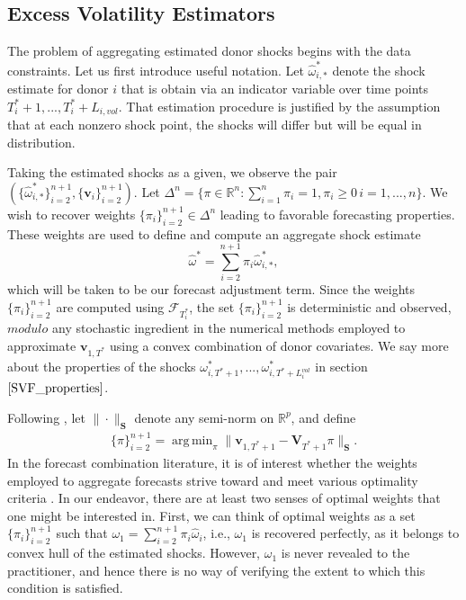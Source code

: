 \documentclass[11pt,3p,review,authoryear]{elsarticle}
\newcommand{\weight}{\pi}
\newcommand{\x}{\textbf{v}}
\newcommand{\V}{\textbf{V}}
\DeclareMathOperator*{\argmin}{arg\,min} %
\theoremstyle{definition}
\begin{document}
\subsection{Excess Volatility Estimators}
    \label{Excess Volatility Estimators}
   
    The problem of aggregating estimated donor shocks begins with the data constraints.  Let us first introduce useful notation.  Let $\hat\omega^{*}_{i,*}$ denote the shock estimate for donor $i$ that is obtain via an indicator variable over time points $T_{i}^{*}+1,...,T_{i}^{*}+L_{i,vol}$.  That estimation procedure is justified by the assumption that at each nonzero shock point, the shocks will differ but will be equal in distribution.  
    
    Taking the estimated shocks as a given, we observe the pair $(\{\hat\omega^{*}_{i,*}\}^{n+1}_{i=2},\{\textbf{v}_{i}\}^{n+1}_{i=2})$.  Let $\Delta^{n} = \{\pi \in \mathbb{R}^n: \sum_{i=1}^n \pi_i = 1, \pi_i \geq 0 \, i = 1,...,n\}$.  We wish to recover weights $\{\weight_{i}\}^{n+1}_{i=2} \in \Delta^{n}$ leading to favorable forecasting properties.  These weights are used to define and compute an aggregate shock estimate 
\begin{equation} \label{adjustment}
	  \hat\omega^{*} = \sum^{n+1}_{i=2}\weight_{i}\hat\omega^{*}_{i,*},
\end{equation}
    which will be taken to be our forecast adjustment term.  Since the weights $\{\weight_{i}\}_{i=2}^{n+1}$ are computed using $\mathcal{F}_{T^{*}_{i}}$, the set $\{\weight_{i}\}_{i=2}^{n+1}$ is deterministic and observed, $\textit{modulo}$ any stochastic ingredient in the numerical methods employed to approximate $\x_{1,T^{*}}$ using a convex combination of donor covariates.  We say more about the properties of the shocks $\omega^{*}_{i,T^{*}+1},...,\omega^{*}_{i,T^{*}+L^{vol}_{i}}$ in section $\ref{SVF_properties}$. 

    Following \citet{abadie2003economic,abadie2010synthetic,lin2021minimizing}, let $\|\cdot\|_{\textbf{S}}$ denote any semi-norm on $\mathbb{R}^{p}$, and define
    \begin{align*}
    \{\pi\}_{i=2}^{n+1} = \argmin_{\pi}\|\x_{1,T^* + 1} - \V_{T^* + 1}\pi\|_{\textbf{S}}. 
    \end{align*}
In the forecast combination literature, it is of interest whether the weights employed to aggregate forecasts strive toward and meet various optimality criteria \citep{timmermann2006forecast,wang2023forecast}.  In our endeavor, there are at least two senses of optimal weights that one might be interested in.  First, we can think of optimal weights as a set $\{\weight_{i}\}_{i=2}^{n+1}$ such that $\omega_{1} = \sum^{n+1}_{i=2}\weight_{i}\hat\omega_{i}$, i.e., $\omega_{1}$ is recovered perfectly, as it belongs to convex hull of the estimated shocks. However, $\omega_{1}$ is never revealed to the practitioner, and hence there is no way of verifying the extent to which this condition is satisfied.
\end{document}
